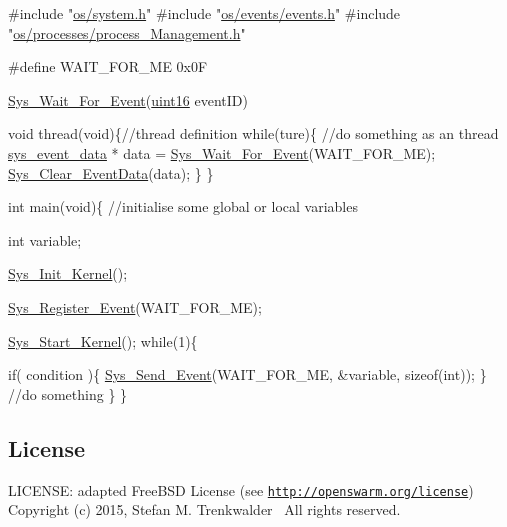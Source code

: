 \begin{DoxyCode}
\textcolor{preprocessor}{#include "\hyperlink{system_8h}{os/system.h}"}
\textcolor{preprocessor}{#include "\hyperlink{events_8h}{os/events/events.h}"}
\textcolor{preprocessor}{#include "\hyperlink{process__Management_8h}{os/processes/process\_Management.h}"}

\textcolor{preprocessor}{#define WAIT\_FOR\_ME 0x0F}

\hyperlink{process__Management_8c_a9f0893d1c6a5ffb1f954737fc3a8904f}{Sys\_Wait\_For\_Event}(\hyperlink{definitions_8h_a05f6b0ae8f6a6e135b0e290c25fe0e4e}{uint16} eventID)

\textcolor{keywordtype}{void} thread(\textcolor{keywordtype}{void})\{\textcolor{comment}{//thread definition}
      \textcolor{keywordflow}{while}(ture)\{
          \textcolor{comment}{//do something as an thread}
          \hyperlink{structsys__event__data__s}{sys\_event\_data} * data = \hyperlink{process__Management_8c_a9f0893d1c6a5ffb1f954737fc3a8904f}{Sys\_Wait\_For\_Event}(WAIT\_FOR\_ME);
          \hyperlink{data_8c_a4ce23b19b4229d1d0ba38d45a9f36bf8}{Sys\_Clear\_EventData}(data);
      \}
\}

\textcolor{keywordtype}{int} main(\textcolor{keywordtype}{void})\{
 \textcolor{comment}{//initialise some global or local variables}

 \textcolor{keywordtype}{int} variable;

    \hyperlink{system_8c_a31ce626d506c2b262ecf5b23946f522f}{Sys\_Init\_Kernel}();

 \hyperlink{events_8c_a386acd8573c1118d80986721664d2689}{Sys\_Register\_Event}(WAIT\_FOR\_ME);
     
 \hyperlink{system_8c_a2e15518324643f26cb240108259b30da}{Sys\_Start\_Kernel}();      
    \textcolor{keywordflow}{while}(1)\{

     \textcolor{keywordflow}{if}( condition )\{
          \hyperlink{events_8c_a24dadcefc1b4c45c50fb351efc8e841c}{Sys\_Send\_Event}(WAIT\_FOR\_ME, &variable, \textcolor{keyword}{sizeof}(\textcolor{keywordtype}{int}));
     \}
     \textcolor{comment}{//do something}
    \}
\}
\end{DoxyCode}
\hypertarget{group__process_process_license}{}\subsection{License}\label{group__process_process_license}
L\+I\+C\+E\+N\+S\+E\+: adapted Free\+B\+S\+D License (see \href{http://openswarm.org/license}{\tt http\+://openswarm.\+org/license})~\newline
Copyright (c) 2015, Stefan M. Trenkwalder~\newline
All rights reserved. 